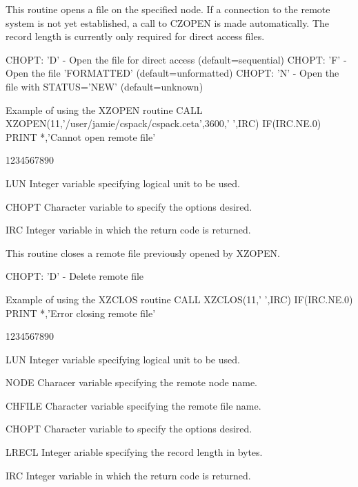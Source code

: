 \par
This routine opens a file on the specified node. If a connection
to the remote system is not yet established, a call to CZOPEN
is made automatically.
The record length is currently only required for direct access files.
\begin{XMP}
CHOPT: 'D' - Open the file for direct access (default=sequential)
CHOPT: 'F' - Open the file 'FORMATTED' (default=unformatted)
CHOPT: 'N' - Open the file with STATUS='NEW' (default=unknown)
\end{XMP}
\begin{XMPt}{Example of using the XZOPEN routine}
      CALL XZOPEN(11,'/user/jamie/cspack/cspack.ceta',3600,' ',IRC)
      IF(IRC.NE.0) PRINT *,'Cannot open remote file'
\end{XMPt}
\begin{DLtt}{1234567890}
\item[LUN]Integer variable specifying logical unit to be used.
\item[CHOPT]Character variable to specify the options desired.
\item[IRC]Integer variable in which the return code is returned.
\end{DLtt}
\par
This routine closes a remote file previously opened by XZOPEN.
\begin{XMP}
CHOPT: 'D' - Delete remote file
\end{XMP}
\begin{XMPt}{Example of using the XZCLOS routine}
      CALL XZCLOS(11,' ',IRC)
      IF(IRC.NE.0) PRINT *,'Error closing remote file'
\end{XMPt}
\begin{DLtt}{1234567890}
\item[LUN]Integer variable specifying logical unit to be used.
\item[NODE]Characer variable specifying the remote node name.
\item[CHFILE]Character variable specifying the remote file name.
\item[CHOPT]Character variable to specify the options desired.
\item[LRECL]Integer ariable specifying the record length in bytes.
\item[IRC]Integer variable in which the return code is returned.
\end{DLtt}
